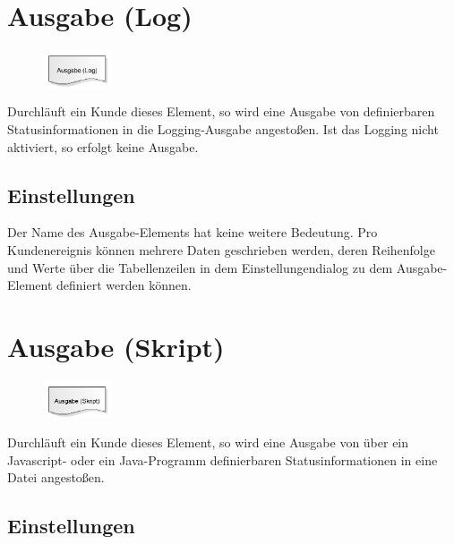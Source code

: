 \section{Ausgabe (Log)}
\label{ref:ModelElementOutputLog}

\begin{figure}
\vspace{-22pt}
\includegraphics[width=2cm]{imageModelElementOutputLog.png}
\vspace{-22pt}
\end{figure}

Durchläuft ein Kunde dieses Element, so wird eine Ausgabe von definierbaren Statusinformationen in
die Logging-Ausgabe angestoßen. Ist das Logging nicht aktiviert, so erfolgt keine Ausgabe.

\subsection*{Einstellungen}

Der Name des Ausgabe-Elements hat keine weitere Bedeutung. Pro Kundenereignis können mehrere Daten
geschrieben werden, deren Reihenfolge und Werte über die Tabellenzeilen in dem Einstellungendialog zu
dem Ausgabe-Element definiert werden können.


\section{Ausgabe (Skript)}
\label{ref:ModelElementOutputJS}

\begin{figure}
\vspace{-22pt}
\includegraphics[width=2cm]{imageModelElementOutputJS.png}
\vspace{-22pt}
\end{figure}

Durchläuft ein Kunde dieses Element, so wird eine Ausgabe von über ein Javascript-
oder ein Java-Programm definierbaren Statusinformationen in eine Datei angestoßen.

\subsection*{Einstellungen}

